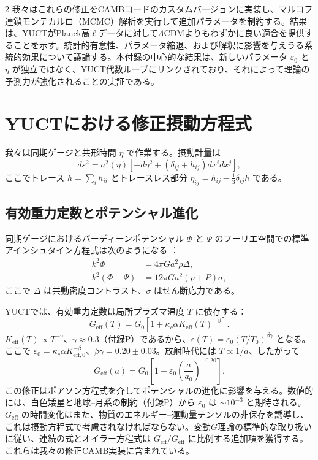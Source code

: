 \documentclass[11pt,a4paper]{article}
\begin{document}
\begin{multicols}{2}
		我々はこれらの修正をCAMBコードのカスタムバージョンに実装し、マルコフ連鎖モンテカルロ（MCMC）解析を実行して追加パラメータを制約する。結果は、YUCTがPlanck高\(\ell\)データに対して\(\Lambda\)CDMよりもわずかに良い適合を提供することを示す。統計的有意性、パラメータ縮退、および解釈に影響を与えうる系統的効果について議論する。本付録の中心的な結果は、新しいパラメータ \(\varepsilon_0\) と \(\eta\) が独立ではなく、YUCT代数ループにリンクされており、それによって理論の予測力が強化されることの実証である。
		
		\section{YUCTにおける修正摂動方程式}
		
		我々は同期ゲージと共形時間 \(\eta\) で作業する。摂動計量は
		\begin{equation}
			ds^2 = a^2(\eta)\left[ -d\eta^2 + (\delta_{ij} + h_{ij}) dx^i dx^j \right],
		\end{equation}
		ここでトレース \(h = \sum_i h_{ii}\) とトレースレス部分 \(\eta_{ij} = h_{ij} - \frac{1}{3}\delta_{ij}h\) である。
		
		\subsection{有効重力定数とポテンシャル進化}
		
		同期ゲージにおけるバーディーンポテンシャル \(\Phi\) と \(\Psi\) のフーリエ空間での標準アインシュタイン方程式は次のようになる \cite{Ma1995}：
		\begin{align}
			k^2 \Phi &= 4\pi G a^2 \rho \Delta, \\
			k^2 (\Phi - \Psi) &= 12\pi G a^2 (\rho+P) \sigma,
		\end{align}
		ここで \(\Delta\) は共動密度コントラスト、\(\sigma\) はせん断応力である。
		
		YUCTでは、有効重力定数は局所プラズマ温度 \(T\) に依存する：
		\begin{equation}
			G_{\mathrm{eff}}(T) = G_0\left[1 + \kappa_c \alpha K_{\mathrm{eff}}(T)^{-\beta}\right].
			\label{eq:Geff}
		\end{equation}
		\(K_{\mathrm{eff}}(T) \propto T^{-\gamma}\)、\(\gamma \approx 0.3\)（付録P）であるから、\(\varepsilon(T) = \varepsilon_0 (T/T_0)^{\beta\gamma}\) となる。ここで \(\varepsilon_0 = \kappa_c \alpha K_{\mathrm{eff},0}^{-\beta}\)、\(\beta\gamma = 0.20 \pm 0.03\)。放射時代には \(T \propto 1/a\)、したがって
		\begin{equation}
			G_{\mathrm{eff}}(a) = G_0\left[1 + \varepsilon_0 \left(\frac{a}{a_0}\right)^{-0.20}\right].
			\label{eq:Geff_a}
		\end{equation}
		この修正はポアソン方程式を介してポテンシャルの進化に影響を与える。数値的には、白色矮星と地球–月系の制約（付録P）から \(\varepsilon_0\) は \(\sim 10^{-3}\) と期待される。\(G_{\mathrm{eff}}\) の時間変化はまた、物質のエネルギー–運動量テンソルの非保存を誘導し、これは摂動方程式で考慮されなければならない。変動\(G\)理論の標準的な取り扱い \cite{Uzan2011} に従い、連続の式とオイラー方程式は \(\dot{G}_{\mathrm{eff}}/G_{\mathrm{eff}}\) に比例する追加項を獲得する。これらは我々の修正CAMB実装に含まれている。
		

\end{multicols}
\end{document}
